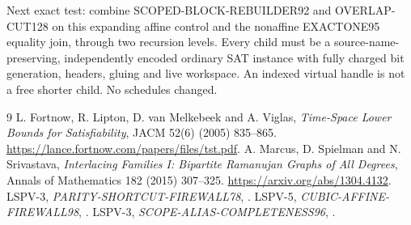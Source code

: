 \documentclass[11pt]{article}
\begin{document}
Next exact test: combine SCOPED-BLOCK-REBUILDER92 and OVERLAP-CUT128 on this expanding affine control and the nonaffine EXACTONE95 equality join, through two recursion levels. Every child must be a source-name-preserving, independently encoded ordinary SAT instance with fully charged bit generation, headers, gluing and live workspace. An indexed virtual handle is not a free shorter child. No schedules changed.

\begin{thebibliography}{9}
 L. Fortnow, R. Lipton, D. van Melkebeek and A. Viglas, \emph{Time-Space Lower Bounds for Satisfiability}, JACM 52(6) (2005) 835--865. \url{https://lance.fortnow.com/papers/files/tst.pdf}.
 A. Marcus, D. Spielman and N. Srivastava, \emph{Interlacing Families I: Bipartite Ramanujan Graphs of All Degrees}, Annals of Mathematics 182 (2015) 307--325. \url{https://arxiv.org/abs/1304.4132}.
 LSPV-3, \emph{PARITY-SHORTCUT-FIREWALL78}, .
 LSPV-5, \emph{CUBIC-AFFINE-FIREWALL98}, .
 LSPV-3, \emph{SCOPE-ALIAS-COMPLETENESS96}, .
\end{thebibliography}
\end{document}
